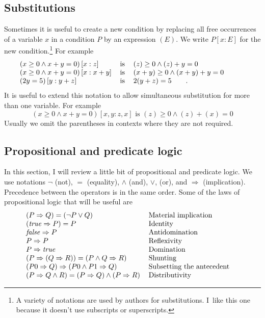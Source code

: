 \documentclass[muchmore,11pt]{article}%
\begin{document}
\subsection{Substitutions}

Sometimes it is useful to create a new condition by replacing all free
occurrences of a variable $x$ in a condition $P$ by an expression $(E)$. We
write $P[x:E]$ for the new condition.\footnote{A variety of notations are used
by authors for substitutions. I\ like this one because it doesn't use
subscripts or superscripts.} For example%
\[%
\begin{tabular}
[c]{lll}%
$\left(  x\geq0\wedge x+y=0\right)  [x:z]$ & is & $\left(  z\right)
\geq0\wedge\left(  z\right)  +y=0$\\
$\left(  x\geq0\wedge x+y=0\right)  [x:x+y]$ & is & $\left(  x+y\right)
\geq0\wedge\left(  x+y\right)  +y=0$\\
$\left(  2y=5\right)  [y:y+z]$ & is & $2(y+z)=5\qquad\text{.}$%
\end{tabular}
\ \ \ \ \ \ \ \ \
\]
It is useful to extend this notation to allow simultaneous substitution for
more than one variable. For example%
\[
\left(  x\geq0\wedge x+y=0\right)  [x,y:z,x]\text{ is }\left(  z\right)
\geq0\wedge\left(  z\right)  +\left(  x\right)  =0
\]
Usually we omit the parentheses in contexts where they are not required.

\subsection{Propositional and predicate logic}

In this section, I will review a little bit of propositional and predicate
logic. We use notations $\lnot$ (not), $=$ (equality), $\wedge$ (and), $\vee$,
(or), and $\Rightarrow$ (implication). Precedence between the operators is in
the same order. Some of the laws of propositional logic that will be useful
are%
\[%
\begin{tabular}
[c]{ll}%
$\left(  P\Rightarrow Q\right)  =\left(  \lnot P\vee Q\right)  $ & Material
implication\\
$\left(  \mathit{true}\Rightarrow P\right)  =P$ & Identity\\
$\mathit{false}\Rightarrow P$ & Antidomination\\
$P\Rightarrow P$ & Reflexivity\\
$P\Rightarrow\mathit{true}$ & Domination\\
$\left(  P\Rightarrow(Q\Rightarrow R)\right)  =\left(  P\wedge Q\Rightarrow
R\right)  $ & Shunting\\
$\left(  P0\Rightarrow Q\right)  \Rightarrow\left(  P0\wedge P1\Rightarrow
Q\right)  $ & Subsetting the antecedent\\
$\left(  P\Rightarrow Q\wedge R\right)  =\left(  P\Rightarrow Q\right)
\wedge\left(  P\Rightarrow R\right)  $ & Distributivity
\end{tabular}
\ \ \ \
\]
\end{document}
